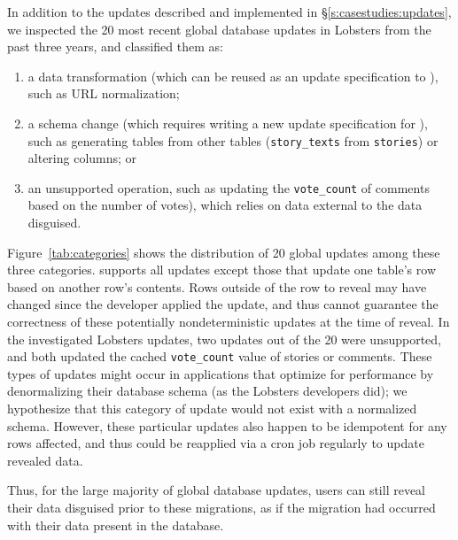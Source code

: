%
In addition to the updates described and implemented in
\S\ref{s:casestudies:updates}, we inspected the 20 most recent
global database updates in
Lobsters from the past three years, and classified them as:
\begin{enumerate}[nosep]
%
    \item a data transformation (which can be reused as an update specification to \sys), such as URL
normalization; 
%
\item a schema change (which requires writing a new update specification for \sys), such as
generating tables from other tables (\eg \texttt{story\_texts} from
\texttt{stories}) or altering columns; or
%
\item an unsupported operation, such as updating the \texttt{vote\_count} of
        comments based on the number of votes), which relies on data external to
        the data disguised.
\end{enumerate}
Figure~\ref{tab:categories} shows the distribution of 20 global updates among these
three categories. 
%
\sys supports all updates except those that update one table's row based on
another row's contents. Rows outside of the row to reveal may have changed since
the developer applied the update, and thus \sys cannot guarantee the correctness
of these potentially nondeterministic updates at the time of reveal. In the investigated Lobsters
updates, two updates out of the 20 were unsupported, and both updated the cached
\texttt{vote\_count} value of stories or comments.
%
%
%
These types of updates might occur in applications that optimize for
performance by denormalizing their database schema (as the Lobsters developers
did); we
hypothesize that this category of update would not exist with a normalized
schema.
%
However, these particular updates also happen to be idempotent for any rows
affected, and thus could be reapplied via a cron job regularly to update
revealed data.
%

%
Thus, for the large majority of global database updates, users can still reveal
their data disguised prior to these migrations, as if the migration had occurred
with their data present in the database.
%

%

